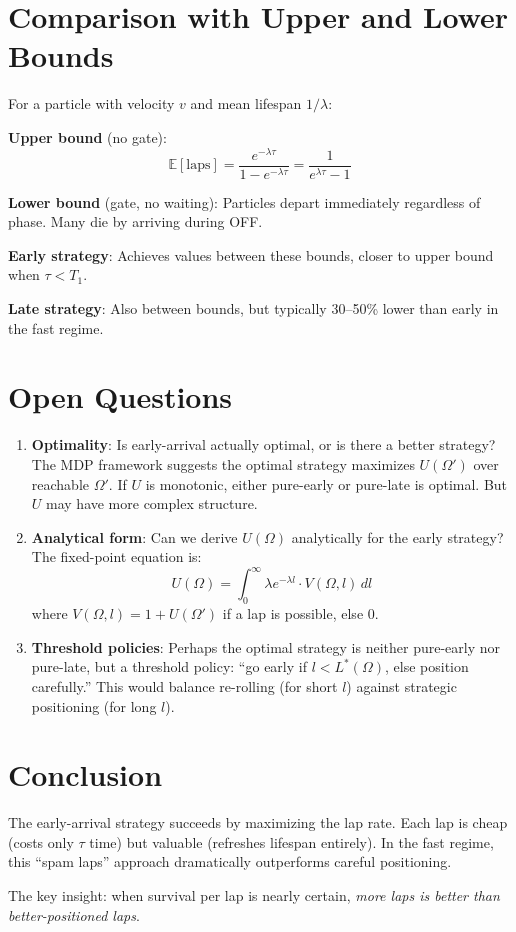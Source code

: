 \documentclass{article}
\newcommand{\E}{\mathbb{E}}
\begin{document}
\section{Comparison with Upper and Lower Bounds}

For a particle with velocity $v$ and mean lifespan $1/\lambda$:

\textbf{Upper bound} (no gate): 
\[
\E[\text{laps}] = \frac{e^{-\lambda\tau}}{1 - e^{-\lambda\tau}} = \frac{1}{e^{\lambda\tau} - 1}
\]

\textbf{Lower bound} (gate, no waiting): Particles depart immediately regardless of phase. Many die by arriving during OFF.

\textbf{Early strategy}: Achieves values between these bounds, closer to upper bound when $\tau < T_1$.

\textbf{Late strategy}: Also between bounds, but typically 30--50\% lower than early in the fast regime.

\section{Open Questions}

\begin{enumerate}
    \item \textbf{Optimality}: Is early-arrival actually optimal, or is there a better strategy? The MDP framework suggests the optimal strategy maximizes $U(\Omega')$ over reachable $\Omega'$. If $U$ is monotonic, either pure-early or pure-late is optimal. But $U$ may have more complex structure.
    
    \item \textbf{Analytical form}: Can we derive $U(\Omega)$ analytically for the early strategy? The fixed-point equation is:
    \[
    U(\Omega) = \int_0^\infty \lambda e^{-\lambda l} \cdot V(\Omega, l) \, dl
    \]
    where $V(\Omega, l) = 1 + U(\Omega')$ if a lap is possible, else 0.
    
    \item \textbf{Threshold policies}: Perhaps the optimal strategy is neither pure-early nor pure-late, but a threshold policy: ``go early if $l < L^*(\Omega)$, else position carefully.'' This would balance re-rolling (for short $l$) against strategic positioning (for long $l$).
\end{enumerate}

\section{Conclusion}

The early-arrival strategy succeeds by maximizing the lap rate. Each lap is cheap (costs only $\tau$ time) but valuable (refreshes lifespan entirely). In the fast regime, this ``spam laps'' approach dramatically outperforms careful positioning.

The key insight: when survival per lap is nearly certain, \emph{more laps is better than better-positioned laps}.
\end{document}
